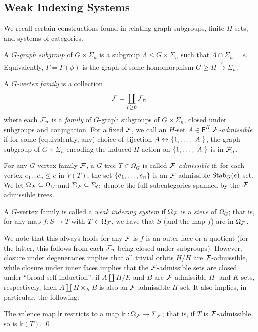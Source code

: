 \documentclass[a4paper,10pt]{article}%
\begin{document}
\subsection{Weak Indexing Systems}

We recall certain constructions found in \cite{Per17} relating graph subgroups, finite $H$-sets, and systems of categories.
\begin{definition}
  A \textit{$G$-graph subgroup} of $G\times \Sigma_n$ is a subgroup $\Lambda \leq G\times \Sigma_n$ such that $\Lambda \cap \Sigma_n = e$. Equivalently, $\Gamma = \Gamma(\phi)$ is the graph of some homomorphism $G \geq H \xrightarrow{\phi} \Sigma_n$. 
\end{definition}
\begin{definition}
  A \textit{$G$-vertex family} is a collection
\[
\mathcal F = \coprod\limits_{n\geq 0}\mathcal F_n
\]
where each $\mathcal F_n$ is a \textit{family} of $G$-graph subgroups of $G\times \Sigma_n$, closed under subgroups and conjugation. For a fixed $\mathcal F$, we call an $H$-set $A\in \mathsf F^H$ \textit{$\mathcal F$-admissible} if for some (equivalently, any) choice of bijection $A \leftrightarrow \left\{1,\ldots, |A|\right\}$, the graph subgroup of $G\times \Sigma_n$ encoding the induced $H$-action on $\left\{1,\ldots, |A|\right\}$ is in $\mathcal F_n$. 
\end{definition}
\begin{definition}
  For any $G$-vertex family $\mathcal F$, a $G$-tree $T\in \Omega_G$ is called \textit{$\mathcal F$-admissible} if, for each vertex $e_1\ldots e_n \leq e$ in $V(T)$, the set $\left\{e_1,\ldots, e_n\right\}$ is an $\mathcal F$-admissible $\mathrm{Stab}_G(e)$-set. We let $\Omega_{\mathcal F}\subseteq \Omega_G$ and $\Sigma_{\mathcal F}\subseteq \Sigma_G$ denote the full subcategories spanned by the $\mathcal F$-admissible trees.
\end{definition}
\begin{definition}
  A $G$-vertex family is called a \textit{weak indexing system} if $\Omega_{\mathcal F}$ is a \textit{sieve} of $\Omega_G$; that is, for any map $f:S \to T$ with $T\in \Omega_{\mathcal F}$, we have that $S$ (and the map $f$) are in $\Omega_{\mathcal F}$.
\end{definition}
We note that this always holds for any $\mathcal F$ is $f$ is an outer face or a quotient (for the latter, this follows from each $\mathcal F_n$ being closed under subgroups). However, closure under degeneracies implies that all trivial orbits $H/H$ are $\mathcal F$-admissible, while closure under inner faces implies that the $\mathcal F$-admissible sets are closed under  ``broad self-induction'': if $A \amalg H/K$ and $B$ are $\mathcal F$-admissible $H$- and $K$-sets, respectively, then $A \amalg H\times_K B$ is also an $\mathcal F$-admissible $H$-set. It also implies, in particular, the following:
\begin{lemma}
  \label{WEAK_INDEXING_VALENCE_LEMMA}
  The valence map $\mathsf{lr}$ restricts to a map $\mathsf{lr}: \Omega_{\mathcal F} \to \Sigma_{\mathcal F}$; that is, if $T$ is $\mathcal F$-admissible, so is $\mathsf{lr}(T)$. \qed
\end{lemma}
\end{document}
